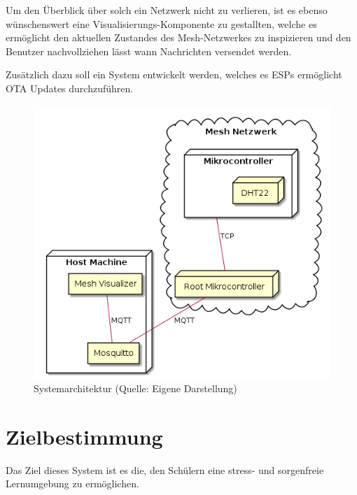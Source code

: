 Um den Überblick über solch ein Netzwerk nicht zu verlieren, ist es ebenso wünschenswert eine Visualisierungs-Komponente zu gestallten, welche es ermöglicht den aktuellen Zustandes des Mesh-Netzwerkes zu inspizieren und den Benutzer nachvollziehen lässt wann Nachrichten versendet werden.

Zusätzlich dazu soll ein System entwickelt werden, welches es ESPs ermöglicht OTA Updates durchzuführen.

\begin{figure}[H]
    \centering
    \includegraphics[scale=0.7]{diagrams/deployment.png}
    \caption{Systemarchitektur (Quelle: Eigene Darstellung)}
    \label{abb:deployment}
\end{figure}

\section{Zielbestimmung}
Das Ziel dieses System ist es die, den Schülern eine stress- und sorgenfreie Lernumgebung zu ermöglichen.